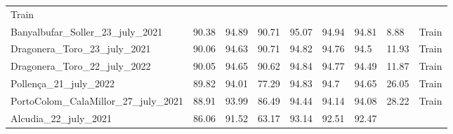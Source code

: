 \begin{table}[H]
{\begin{tabular}{lllllllll}
            {\color[HTML]{66c2a5} Train}
            \\
            Banyalbufar\_Soller\_23\_july\_2021    & 90.38               &
            94.89
                                                   & 90.71               &
            95.07
                                                   & 94.94               &
            94.81
                                                   & 8.88                &
            {\color[HTML]{66c2a5} Train}
            \\
            Dragonera\_Toro\_23\_july\_2021        & 90.06               &
            94.63
                                                   & 90.71               &
            94.82
                                                   & 94.76               & 94.5
                                                   & 11.93               &
            {\color[HTML]{66c2a5} Train}
            \\
            Dragonera\_Toro\_22\_july\_2022        & 90.05               &
            94.65
                                                   & 90.62               &
            94.84
                                                   & 94.77               &
            94.49
                                                   & 11.87               &
            {\color[HTML]{66c2a5} Train}
            \\
            Pollença\_21\_july\_2022               & 89.82               &
            94.01
                                                   & 77.29               &
            94.83
                                                   & 94.7                &
            94.65
                                                   & 26.05               &
            {\color[HTML]{66c2a5} Train}
            \\
            PortoColom\_CalaMillor\_27\_july\_2021 & 88.91               &
            93.99
                                                   & 86.49               &
            94.44
                                                   & 94.14               &
            94.08
                                                   & 28.22               &
            {\color[HTML]{66c2a5} Train}
            \\
            Alcudia\_22\_july\_2021                & 86.06               &
            91.52
                                                   & 63.17               &
            93.14
                                                   & 92.51               &
            92.47

\end{tabular}}
\end{table}
